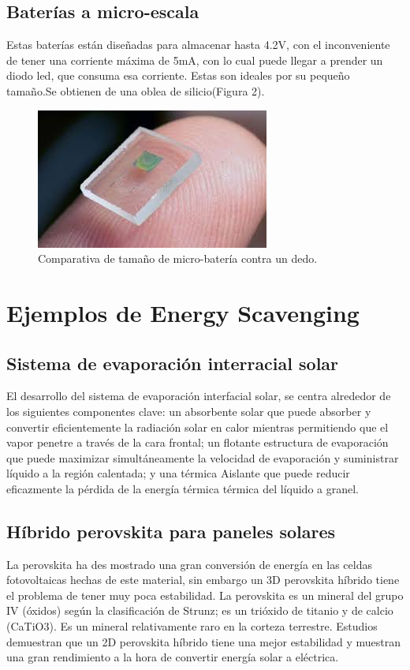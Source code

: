 \documentclass[journal, a4paper]{IEEEtran}
\begin{document}
\subsection{Baterías a micro-escala\citep{Roundy2005}}
Estas baterías están diseñadas para almacenar hasta 4.2V, con el inconveniente de tener una corriente máxima de 5mA, con lo cual puede llegar a prender un diodo led, que consuma esa corriente. Estas son ideales por su pequeño tamaño.Se obtienen de una oblea de silicio(Figura 2). 
\begin{figure}[H]
\centering
\includegraphics[scale=0.5]{ubateria.jpg}
\caption{Comparativa de tamaño de micro-batería\citep{Nunez2019} contra un dedo.}
\label{fig:ubateria}
\end{figure}
\section{Ejemplos de Energy Scavenging}
\subsection{Sistema de evaporación interracial solar}
El desarrollo del sistema de evaporación interfacial solar\citep{Tao2018},
se centra alrededor de los siguientes componentes clave: un absorbente solar que puede absorber y convertir eficientemente la radiación solar en calor mientras permitiendo que el vapor penetre a través de la cara frontal; un flotante estructura de evaporación que puede maximizar simultáneamente la velocidad de evaporación y suministrar líquido a la región calentada; y una térmica
Aislante que puede reducir eficazmente la pérdida de la energía térmica térmica del líquido a granel.

\subsection{Híbrido  perovskita para paneles solares}
La  perovskita ha des mostrado una gran conversión de energía en las celdas fotovoltaicas hechas de este material, sin embargo un 3D  perovskita híbrido\citep{Grancini2018} tiene el problema de tener muy poca estabilidad. La  perovskita es un mineral del grupo IV (óxidos) según la clasificación de Strunz; es un trióxido de titanio y de calcio (CaTiO3). Es un mineral relativamente raro en la corteza terrestre. Estudios demuestran que un 2D perovskita híbrido tiene una mejor estabilidad y muestran una gran rendimiento a la hora de convertir energía solar a eléctrica.
\end{document}
